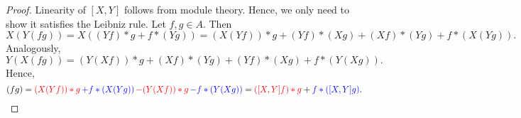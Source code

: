 \begin{proof}
  Linearity of $[X, Y]$ follows from module theory.
  Hence, we only need to show it satisfies the Leibniz rule.
  Let $f, g \in A$.
  Then
  \begin{equation}
    X(Y(f g))
    = X((Y f) * g + f * (Y g))
    = (X(Y f)) * g + (Y f) * (X g) + (X f) * (Y g) + f * (X (Y g)).
  \end{equation}
  Analogously,
  \begin{equation}
    Y(X(f g)) = (Y(X f)) * g + (X f) * (Y g) + (Y f) * (X g) + f * (Y (X g)).
  \end{equation}
  Hence,
  \begin{equation}
    [X, Y](f g)
    = {\color{red} (X(Y f)) * g}\,
      {\color{blue} + f * (X (Y g))}\,
      {\color{red} - (Y(X f)) * g}\,
      {\color{blue}- f * (Y (X g))}
    = {\color{red}([X, Y] f) * g} + {\color{blue} f * ([X, Y] g)}.
    \qedhere
  \end{equation}
\end{proof}
